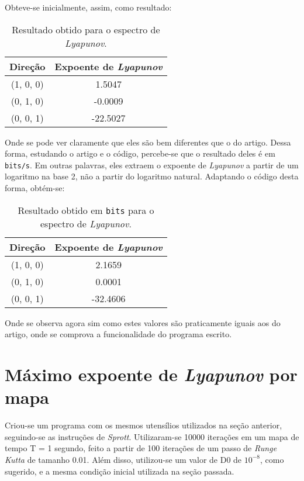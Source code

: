 \documentclass{article}[twocolumn]
\begin{document}
	Obteve-se inicialmente, assim, como resultado:
	\begin{table}[H]
		\centering
		\begin{tabular}{cc}
			\hline
			Dire\c{c}\~ao & Expoente de \textit{Lyapunov}\\
			\hline
			(1, 0, 0) &  1.5047\\
			(0, 1, 0) & -0.0009\\
			(0, 0, 1) & -22.5027\\
			\hline
		\end{tabular}
		\caption{Resultado obtido para o espectro de \textit{Lyapunov}.}
	\end{table}
	Onde se pode ver claramente que eles s\~ao bem diferentes que o do artigo. Dessa forma,
	estudando o artigo e o c\'odigo, percebe-se que o resultado deles \'e em \texttt{bits/s}.
	Em outras palavras, eles extraem o expoente de \textit{Lyapunov} a partir de um logaritmo
	na base 2, n\~ao a partir do logaritmo natural. Adaptando o c\'odigo desta forma, obt\'em-se:
	\begin{table}[H]
		\centering
		\begin{tabular}{cc}
			\hline
			Dire\c{c}\~ao & Expoente de \textit{Lyapunov}\\
			\hline
			(1, 0, 0) &  2.1659\\
			(0, 1, 0) &  0.0001\\
			(0, 0, 1) & -32.4606\\
			\hline
		\end{tabular}
		\caption{Resultado obtido em \texttt{bits} para o espectro de \textit{Lyapunov}.}
	\end{table}
	Onde se observa agora sim como estes valores s\~ao praticamente iguais aos do artigo,
	onde se comprova a funcionalidade do programa escrito.
	\section{M\'aximo expoente de \textit{Lyapunov} por mapa}
	Criou-se um programa com os mesmos utens\'ilios utilizados na se\c{c}\~ao anterior,
	seguindo-se as instru\c{c}\~oes de \textit{Sprott}. Utilizaram-se 10000 itera\c{c}\~oes
	em um mapa de tempo T = 1 segundo, feito a partir de 100 itera\c{c}\~oes de um passo de
	\textit{Runge Kutta} de tamanho 0.01. Al\'em disso, utilizou-se um valor de D0 de $10^{-8}$,
	como sugerido, e a mesma condi\c{c}\~ao inicial utilizada na se\c{c}\~ao passada.
\end{document}
